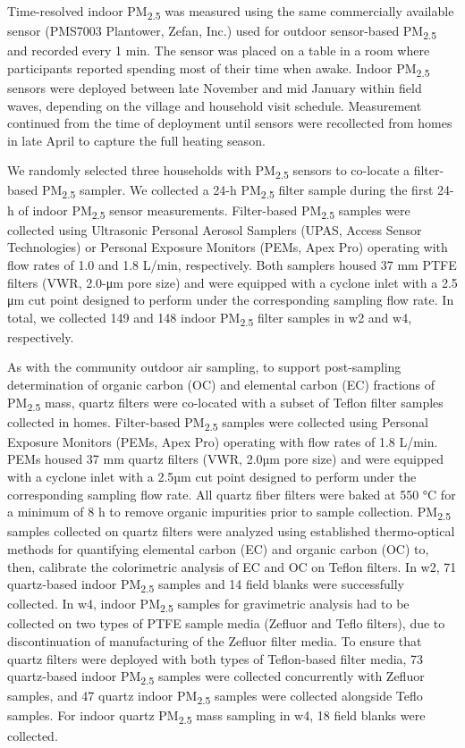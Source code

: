 \documentclass[
  letterpaper,
  DIV=11,
  numbers=noendperiod]{scrartcl}
\begin{document}
Time-resolved indoor PM\textsubscript{2.5} was measured using the same
commercially available sensor (PMS7003 Plantower, Zefan, Inc.) used for
outdoor sensor-based PM\textsubscript{2.5} and recorded every 1 min. The
sensor was placed on a table in a room where participants reported
spending most of their time when awake. Indoor PM\textsubscript{2.5}
sensors were deployed between late November and mid January within field
waves, depending on the village and household visit schedule.
Measurement continued from the time of deployment until sensors were
recollected from homes in late April to capture the full heating season.

We randomly selected three households with PM\textsubscript{2.5} sensors
to co-locate a filter-based PM\textsubscript{2.5} sampler. We collected
a 24-h PM\textsubscript{2.5} filter sample during the first 24-h of
indoor PM\textsubscript{2.5} sensor measurements. Filter-based
PM\textsubscript{2.5} samples were collected using Ultrasonic Personal
Aerosol Samplers (UPAS, Access Sensor Technologies) or Personal Exposure
Monitors (PEMs, Apex Pro) operating with flow rates of 1.0 and 1.8
L/min, respectively. Both samplers housed 37 mm PTFE filters (VWR,
2.0-μm pore size) and were equipped with a cyclone inlet with a 2.5 μm
cut point designed to perform under the corresponding sampling flow
rate. In total, we collected 149 and 148 indoor PM\textsubscript{2.5}
filter samples in w2 and w4, respectively.

As with the community outdoor air sampling, to support post-sampling
determination of organic carbon (OC) and elemental carbon (EC) fractions
of PM\textsubscript{2.5} mass, quartz filters were co-located with a
subset of Teflon filter samples collected in homes. Filter-based
PM\textsubscript{2.5} samples were collected using Personal Exposure
Monitors (PEMs, Apex Pro) operating with flow rates of 1.8 L/min. PEMs
housed 37 mm quartz filters (VWR, 2.0µm pore size) and were equipped
with a cyclone inlet with a 2.5µm cut point designed to perform under
the corresponding sampling flow rate. All quartz fiber filters were
baked at 550 °C for a minimum of 8 h to remove organic impurities prior
to sample collection. PM\textsubscript{2.5} samples collected on quartz
filters were analyzed using established thermo-optical methods for
quantifying elemental carbon (EC) and organic carbon (OC) to, then,
calibrate the colorimetric analysis of EC and OC on Teflon filters. In
w2, 71 quartz-based indoor PM\textsubscript{2.5} samples and 14 field
blanks were successfully collected. In w4, indoor PM\textsubscript{2.5}
samples for gravimetric analysis had to be collected on two types of
PTFE sample media (Zefluor and Teflo filters), due to discontinuation of
manufacturing of the Zefluor filter media. To ensure that quartz filters
were deployed with both types of Teflon-based filter media, 73
quartz-based indoor PM\textsubscript{2.5} samples were collected
concurrently with Zefluor samples, and 47 quartz indoor
PM\textsubscript{2.5} samples were collected alongside Teflo samples.
For indoor quartz PM\textsubscript{2.5} mass sampling in w4, 18 field
blanks were collected.
\end{document}
